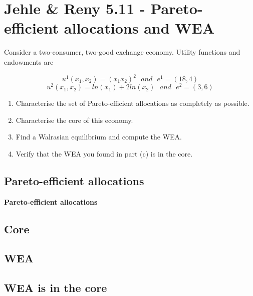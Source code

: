 \documentclass{article}
\begin{document}
\section{Jehle \& Reny 5.11 - Pareto-efficient allocations and WEA}

Consider a two-consumer, two-good exchange economy. Utility functions and endowments are

$$u^1(x_1,x_2) = (x_1x_2)^2 \ \ \ and \ \ \  e^1 = (18,4)$$
$$u^2(x_1,x_2) = ln(x_1) + 2 ln(x_2) \ \ \ and \ \ \  e^2 = (3,6)$$

\begin{enumerate}
\item Characterise the set of Pareto-efficient allocations as completely as possible.
\item Characterise the core of this economy.
\item Find a Walrasian equilibrium and compute the WEA.
\item Verify that the WEA you found in part (c) is in the core.
\end{enumerate}

\subsection{Pareto-efficient allocations}

\begin{mdframed}[backgroundcolor=blue!20,linecolor=white]
\textbf{Pareto-efficient allocations}



\end{mdframed}



\subsection{Core}




\subsection{WEA}




\subsection{WEA is in the core}
\end{document}
